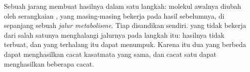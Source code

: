 \begin{proposition}\label{prop:g11:enzymes-and-phenotype:pathway}
Sebuah  jarang membuat hasilnya dalam satu langkah: molekul awalnya
diubah oleh serangkaian , yang masing-masing bekerja pada hasil
 sebelumnya, di sepanjang sebuah \emph{jalur
metabolisme}. Tiap  disandikan 
sendiri.  yang tidak bekerja dari salah satunya menghalangi jalurnya
pada langkah itu: hasilnya tidak terbuat, dan   yang
terhalang itu dapat menumpuk. Karena itu dua  yang berbeda dapat
menghasilkan cacat kasatmata yang sama, dan cacat satu  dapat
menghasilkan beberapa cacat.
\end{proposition}
\admitted

